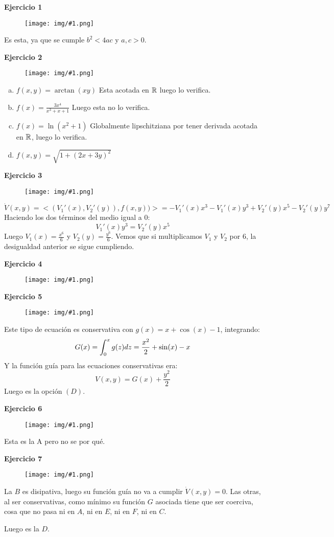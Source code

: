 \documentclass[12pt]{article}
\theoremstyle{definition}
\theoremstyle{remark}
\newcommand{\ejercicioo}[1]{
\textbf{Ejercicio #1 }

\begin{figure}[H]
\center
\texttt{[image: img/\#1.png]}
\end{figure}

}
\begin{document}
\ejercicioo{1}

Es esta, ya que se cumple $b^2<4ac$ y $a,c>0$.

\medskip

\ejercicioo{2}

\begin{enumerate}[(a)]
\item $f(x,y)=\arctan(xy)$ Esta acotada en $\mathbb{R}$ luego lo verifica.
\item $f(x)=\frac{3x^4}{x^3+x+1}$ Luego esta no lo verifica.
\item $f(x)=\ln(x^2+1)$ Globalmente lipschitziana por tener derivada acotada en $\mathbb{R}$, luego lo verifica.
\item $f(x,y)=\sqrt{1+(2x+3y)^2}$ 
\end{enumerate}

\medskip

\ejercicioo{3}

\[
\dot{V}(x,y)=<(V_1'(x),V_2'(y)),f(x,y))>=-V_1'(x)x^3-V_1'(x)y^3+V_2'(y)x^5-V_2'(y)y^7
\]
Haciendo los dos términos del medio igual a 0:
\[
V_1'(x)y^3=V_2'(y)x^5
\]
Luego $V_1(x)=\frac{x^6}{6}$ y $V_2(y)=\frac{y^6}{6}$. Vemos que si multiplicamos $V_1$ y $V_2$ por 6, la desigualdad anterior se sigue cumpliendo.

\medskip

\ejercicioo{4}

\medskip

\ejercicioo{5}

Este tipo de ecuación es conservativa con $g(x)=x+\cos(x)-1$, integrando:
\[
G(x)=\displaystyle\int_{ 0 }^{ x } g(z)dz=\frac{x^2}{2}+\sin(x)-x
\]
Y la función guía para las ecuaciones conservativas era:
\[
V(x,y)=G(x)+\frac{y^2}{2}
\]
Luego es la opción $(D)$.

\medskip

\ejercicioo{6}

Esta es la A pero no se por qué.

\medskip

\ejercicioo{7}

La $B$ es disipativa, luego su función guía no va a cumplir $\dot{V}(x,y)=0$. Las otras, al ser conservativas, como mínimo su función $G$ asociada tiene que ser coerciva, cosa que no pasa ni en $A$, ni en $E$, ni en $F$, ni en $C$. 

Luego es la $D$.
\end{document}

